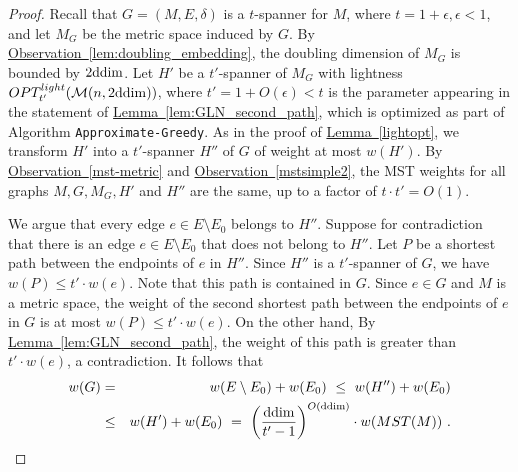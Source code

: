 \documentclass[11pt,letterpaper]{article}
\newcommand{\ddim}{{\rm ddim}}
\newcommand{\eps}{\epsilon}
\newcommand{\namedref}[2]{\hyperref[#2]{#1~\ref*{#2}}}
\newcommand{\lemmaref}[1]{\namedref{Lemma}{#1}}
\newcommand{\observationref}[1]{\namedref{Observation}{#1}}
\begin{document}
\begin{proof}					
	Recall that $G = (M,E,\delta)$ is a $t$-spanner for $M$, where $t = 1+\eps, \eps < 1$,  and let $M_G$ be the metric space induced by $G$.
	By \observationref{lem:doubling_embedding}, the doubling dimension of $M_G$ is bounded by $2 \ddim$.
	Let $H'$ be a $t'$-spanner of $M_G$ with lightness $OPT^{light}_{t'}(\mathcal{M}(n,2\ddim))$, where $t' = 1+O(\eps) < t$
	is the parameter appearing in the statement of \lemmaref{lem:GLN_second_path}, which is optimized as part of Algorithm  \texttt{Approximate-Greedy}.
	As in the proof of \lemmaref{lightopt}, we transform $H'$ into a $t'$-spanner $H''$ of $G$ of weight at most $w(H')$.
	By \observationref{mst-metric} and \observationref{mstsimple2}, the MST weights for all graphs $M,G,M_G,H'$ and $H''$ are the same, up to a factor of $t \cdot t' = O(1)$.
	
	
	We argue that every edge $e \in E \setminus E_0$ belongs to $H''$.
	Suppose for contradiction that there is an edge $e \in E \setminus E_0$ that does not belong to $H''$.
	Let $P$ be a shortest path between the endpoints of $e$ in $H''$. Since $H''$ is a $t'$-spanner of $G$, we have $w(P) \le t' \cdot w(e)$.
	Note that this path is contained in $G$. Since $e \in G$ and $M$ is a metric space, the weight of the second shortest path between the endpoints of $e$ in $G$ is at most
	$w(P) \le t' \cdot w(e)$.
	On the other hand, By \lemmaref{lem:GLN_second_path}, the weight of this path is greater than $t'\cdot w(e)$, a contradiction.
	It follows that
	\begin{eqnarray*}
		w(G) & = & w(E\setminus E_{0}) +w(E_{0}) ~\le~ w(H'')+w(E_{0})\\
		& \le & w(H')+w(E_{0}) ~=~ \left(\frac{\ddim}{t'-1}\right)^{O(\ddim)} \cdot w(MST(M))~.
	\end{eqnarray*}
\end{proof}
\end{document}
